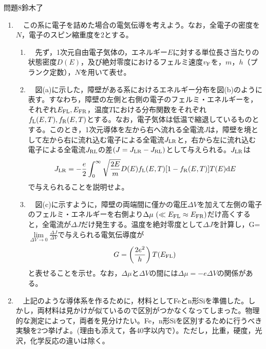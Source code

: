\documentclass[fleqn]{jbook}
\def\F{{\rm F}}
\def\L{{\rm L}}
\def\R{{\rm R}}
\def\ds{\displaystyle}
\begin{document}
\begin{question}{問題8}{鈴木了}
\begin{enumerate}
  \item 　この系に電子を詰めた場合の電気伝導を考えよう。なお，全電子の密度を$N$，電子のスピン縮重度を2とする。\\
  
    \begin{enumerate}
    
    \item 　先ず，1次元自由電子気体の，エネルギー$E$に対する単位長さ当たりの状態密度$D(E)$，及び絶対零度におけるフェルミ速度$v_\F$を，$m$，$h$（プランク定数），$N$を用いて表せ。\\
    
    \item 　図(a)に示した，障壁がある系におけるエネルギー分布を図(b)のように表す。すなわち，障壁の左側と右側の電子のフェルミ・エネルギーを，それぞれ$E_{\F\L},E_{\F\R}$，温度$T$における分布関数をそれぞれ$f_\L(E,T),f_\R(E,T)$とする。なお，電子気体は低温で縮退しているものとする。このとき，1次元導体を左から右へ流れる全電流$J$は，障壁を境として左から右に流れ込む電子による全電流$J_{\L\R}$と，右から左に流れ込む電子による全電流$J_{\R\L}$の差$(J=J_{\L\R}-J_{\R\L})$として与えられる。$J_{\L\R}$は
\begin{equation}
 J_{\L\R}=-\frac{e}{2} \int_0^{\infty}\sqrt{\frac{2E}{m}}D(E)f_\L(E,T)
   [1-f_\R(E,T)]T(E)\d E
\end{equation}
で与えられることを説明せよ。\\

    \item 　図(c)に示すように，障壁の両端間に僅かの電圧$\Delta V$を加えて左側の電子のフェルミ・エネルギーを右側より$\Delta\mu~(\ll E_{\F\L} \approx E_{\F\R})$だけ高くすると，全電流が$\Delta J$だけ発生する。温度を絶対零度として$\Delta J$を計算し，G=$\ds \mathop {\lim }\limits_{\Delta V \to 0}\frac{\Delta J}{\Delta V}$で与えられる電気伝導度が
$$
G=\left(\frac{2e^2}{h}\right)T(E_{\F\L})
$$
と表せることを示せ。なお，$\Delta\mu$と$\Delta V$の間には$\Delta\mu=-e\Delta V$の関係がある。\\

\end{enumerate}

  \item 　上記のような導体系を作るために，材料としてFeとn形Siを準備した。しかし，両材料は見かけが似ているので区別がつかなくなってしまった。物理的な測定によって，両者を見分けたい。Fe，n形Siを区別するために行うべき実験を2つ挙げよ。(理由も添えて，各40字以内で）。ただし，比重，硬度，光沢，化学反応の違いは除く。\\
  
\end{enumerate}


\end{question}
\end{document}

